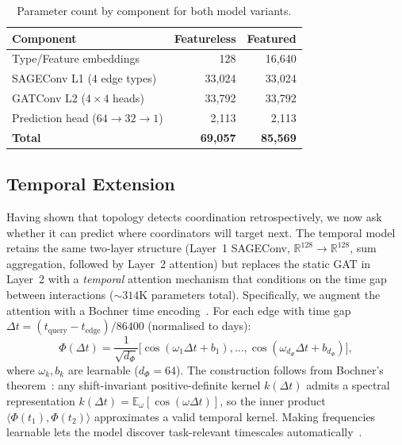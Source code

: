 \documentclass[10pt,journal]{IEEEtran}
\begin{document}
\begin{table}[t]
\caption{Parameter count by component for both model variants.}
\label{tab:params}
\centering\small
\begin{tabular}{lrr}
\toprule
Component & Featureless & Featured \\
\midrule
Type/Feature embeddings & 128  & 16{,}640 \\
SAGEConv L1 ($4$ edge types) & 33{,}024 & 33{,}024 \\
GATConv L2 ($4\times4$ heads) & 33{,}792 & 33{,}792 \\
Prediction head ($64\to32\to1$) & 2{,}113 & 2{,}113 \\
\midrule
\textbf{Total} & \textbf{69{,}057} & \textbf{85{,}569} \\
\bottomrule
\end{tabular}
\end{table}

\subsection{Temporal Extension}
\label{sec:temporal}

Having shown that topology detects coordination retrospectively, we
now ask whether it can predict where coordinators will target next.
The temporal model retains the same two-layer structure (Layer~1
SAGEConv, $\mathbb{R}^{128}\to\mathbb{R}^{128}$, sum aggregation,
followed by Layer~2 attention) but replaces the static GAT in Layer~2
with a \emph{temporal} attention mechanism that conditions on the
time gap between interactions (${\sim}314$K parameters total).
Specifically, we augment the attention with a Bochner time
encoding~\cite{xu2020tgat}. For each edge with time gap
$\Delta t = (t_{\text{query}} - t_{\text{edge}})/86400$ (normalised
to days):
\begin{equation}
  \Phi(\Delta t) = \frac{1}{\sqrt{d_\Phi}}
    \bigl[\cos(\omega_1\Delta t + b_1),\ldots,
    \cos(\omega_{d_\Phi}\Delta t + b_{d_\Phi})\bigr],
  \label{eq:bochner}
\end{equation}
where $\omega_k, b_k$ are learnable ($d_\Phi{=}64$). The construction
follows from Bochner's theorem~\cite{rahimi2007random}: any
shift-invariant positive-definite kernel $k(\Delta t)$ admits a
spectral representation
$k(\Delta t)=\mathbb{E}_\omega[\cos(\omega\Delta t)]$, so the inner
product $\langle\Phi(t_1),\Phi(t_2)\rangle$ approximates a valid
temporal kernel. Making frequencies learnable lets the model discover
task-relevant timescales automatically~\cite{xu2020tgat}.
\end{document}

